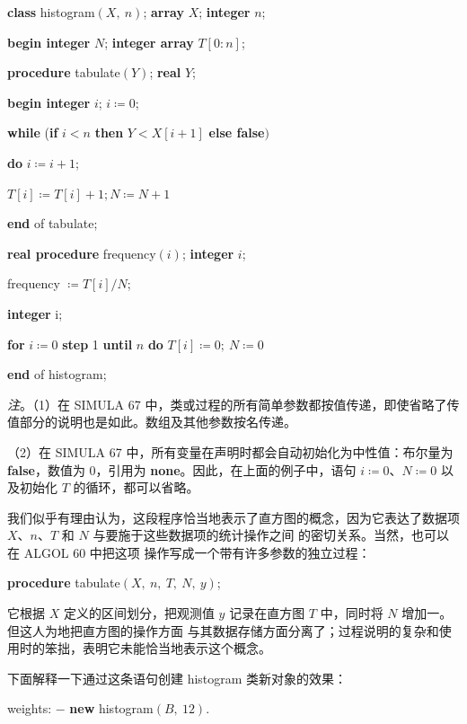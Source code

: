 \documentclass[twoside,11pt,fontset=none]{ctexbook}
\begin{document}
\quad \textbf{class} histogram$(X,\ n)$; \textbf{array} $X$; \textbf{integer} $n$;

\quad \quad \textbf{begin integer} $N$; \textbf{integer array} $T[0:n]$;

\quad \quad \quad \textbf{procedure} tabulate$(Y)$; \textbf{real} $Y$;

\quad \quad \quad \quad \textbf{begin integer} $i$; $i\coloneq 0$;

\quad \quad \quad \quad \quad \textbf{while} (\textbf{if} $i < n$ \textbf{then} $Y < X[i + 1]$ \textbf{else false}$)$

\quad \quad \quad \quad \quad \quad \textbf{do} $i\coloneq i + 1$;

\quad \quad \quad \quad \quad $T[i] \coloneq T[i] + 1; N\coloneq N + 1$

\quad \quad \quad \quad \textbf{end} of tabulate;

\quad \quad \quad \textbf{real procedure} frequency$(i)$; \textbf{integer} $i$;

\quad \quad \quad \quad frequency $\coloneq T[i]/N$;

\quad \quad \quad \textbf{integer} i;

\quad \quad \quad \textbf{for} $i\coloneq 0$ \textbf{step} 1 \textbf{until} $n$ \textbf{do} $T[i]\coloneq 0;\ N\coloneq 0$

\quad \textbf{end} of histogram;

\textit{注}。（1）在 SIMULA 67 中，类或过程的所有简单参数都按值传递，即使省略了传值部分的说明也是如此。数组及其他参数按名传递。

（2）在 SIMULA 67 中，所有变量在声明时都会自动初始化为中性值：布尔量为 \textbf{false}，数值为 0，引用为 \textbf{none}。因此，在上面的例子中，语句 $i\coloneq 0$、$N\coloneq 0$ 以及初始化 $T$ 的循环，都可以省略。

我们似乎有理由认为，这段程序恰当地表示了直方图的概念，因为它表达了数据项 $X$、$n$、$T$ 和 $N$ 与要施于这些数据项的统计操作之间
的密切关系。当然，也可以在 ALGOL 60 中把这项
操作写成一个带有许多参数的独立过程：

\quad \textbf{procedure} tabulate$(X,\ n,\ T,\ N,\ y)$;

\noindent
它根据 $X$ 定义的区间划分，把观测值 $y$ 记录在直方图 $T$ 中，同时将 $N$ 增加一。但这人为地把直方图的操作方面
与其数据存储方面分离了；过程说明的复杂和使用时的笨拙，表明它未能恰当地表示这个概念。

下面解释一下通过这条语句创建 histogram 类新对象的效果：

\quad weights: $-$ \textbf{new} histogram$(B,\ 12)$.
\end{document}
